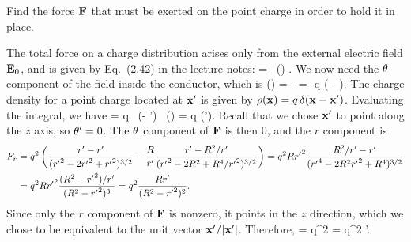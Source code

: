 \begin{problem}
	Find the force $\mathbf{F}$ that must be exerted on the point charge in order to hold it in place.
\end{problem}

\begin{solution}
	The total force on a charge distribution arises only from the external electric field $\mathbf{E}_0$, and is given by Eq.~(2.42) in the lecture notes:
	\beq
		\vF = \int \rhox \, \vEo(\vx) \dcx.
	\eeq
	We now need the $\theta$ component of the field inside the conductor, which is
	\beq
		\Etht(\vx) = - \pdv{\Gdxxp}{\tht}
		= -q \left(  -  \right).
	\eeq
	The charge density for a point charge located at $\mathbf{x}'$ is given by $\rho(\mathbf{x}) = q \, \delta(\mathbf{x} - \mathbf{x}')$.  Evaluating the integral, we have
	\beq
		\vF = \int q \, \delta(\vx - \vx') \, \vE(\vx) \dcx = q \vE(\vx').
	\eeq
	Recall that we chose $\mathbf{x}'$ to point along the $z$ axis, so $\theta' = 0$.  The $\theta$ component of $\mathbf{F}$ is then $0$, and the $r$ component is
	\begin{align*}
		F_r &= q^2 \left( \frac{r' - r'}{({r'}^2 - 2 {r'}^2 + {r'}^2)^{3/2}} - \frac{R}{r'} \frac{r' - R^2 / r'}{({r'}^2 - 2 R^2 + R^4 / {r'}^2)^{3/2}} \right)
		= q^2 R {r'}^2 \frac{R^2 / r' - r'}{({r'}^4 - 2 R^2 {r'}^2 + R^4)^{3/2}} \\
		&= q^2 R {r'}^2 \frac{(R^2 - {r'}^2) / r'}{(R^2 - {r'}^2)^3}
		= q^2 \frac{R r'}{(R^2 - {r'}^2)^2}.
	\end{align*}
	Since only the $r$ component of $\mathbf{F}$ is nonzero, it points in the $z$ direction, which we chose to be equivalent to the unit vector $\mathbf{x}' / \abs{\mathbf{x}'}$.  Therefore,
	\beq
		\vF = q^2  
		= q^2  \vx'.
	\eeq
\end{solution}
